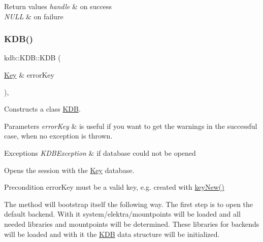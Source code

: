 \begin{DoxyRetVals}{Return values}
{\em handle} & on success \\
\hline
{\em N\+U\+LL} & on failure \\
\hline
\end{DoxyRetVals}
\mbox{\label{classkdb_1_1KDB_a98e25c7fe2f47c5a90461676c6d219e7}} 
\subsubsection{\texorpdfstring{KDB()}{KDB()}\hspace{0.1cm}{\footnotesize\ttfamily [2/2]}}
{\footnotesize\ttfamily kdb\+::\+K\+D\+B\+::\+K\+DB (\begin{DoxyParamCaption}\item[{\mbox{\hyperlink{classkdb_1_1Key}{Key}} \&}]{error\+Key }\end{DoxyParamCaption})\hspace{0.3cm}{\ttfamily [inline]}, {\ttfamily [explicit]}}



Constructs a class \mbox{\hyperlink{classkdb_1_1KDB}{K\+DB}}. 


\begin{DoxyParams}{Parameters}
{\em error\+Key} & is useful if you want to get the warnings in the successful case, when no exception is thrown.\\
\hline
\end{DoxyParams}

\begin{DoxyExceptions}{Exceptions}
{\em K\+D\+B\+Exception} & if database could not be opened\\
\hline
\end{DoxyExceptions}
Opens the session with the \mbox{\hyperlink{classkdb_1_1Key}{Key}} database. \begin{DoxyPrecond}{Precondition}
error\+Key must be a valid key, e.\+g. created with \mbox{\hyperlink{group__key_gad23c65b44bf48d773759e1f9a4d43b89}{key\+New()}}
\end{DoxyPrecond}
The method will bootstrap itself the following way. The first step is to open the default backend. With it system/elektra/mountpoints will be loaded and all needed libraries and mountpoints will be determined. These libraries for backends will be loaded and with it the {\ttfamily \mbox{\hyperlink{classkdb_1_1KDB}{K\+DB}}} data structure will be initialized.

